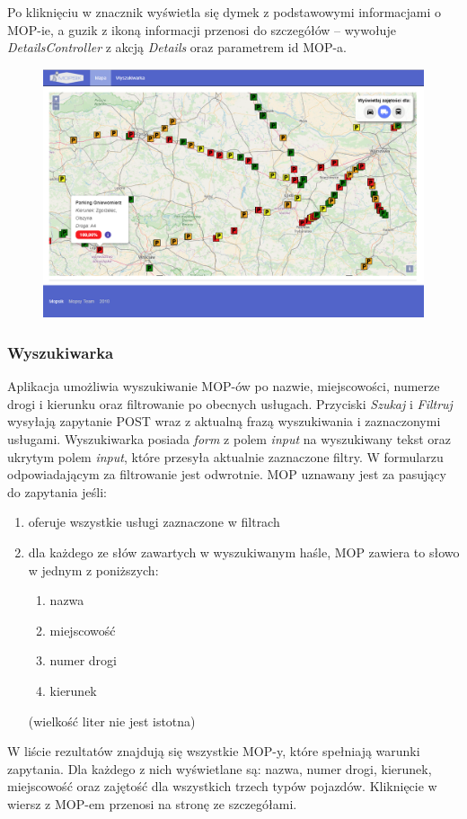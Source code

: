 Po kliknięciu w znacznik wyświetla się dymek z podstawowymi informacjami o MOP-ie, a guzik z ikoną informacji przenosi do szczegółów -- wywołuje \textit{DetailsController} z akcją \textit{Details} oraz parametrem id MOP-a.

\begin{figure}[!htb]
\centering
\includegraphics[width=\textwidth]{images/mopsik_www/map.png}
\label{mopsik_www_map}
\end{figure}

\subsubsection{Wyszukiwarka}
Aplikacja umożliwia wyszukiwanie MOP-ów po nazwie, miejscowości, numerze drogi i kierunku oraz filtrowanie po obecnych usługach. Przyciski \textit{Szukaj} i \textit{Filtruj} wysyłają zapytanie POST wraz z aktualną frazą wyszukiwania i zaznaczonymi usługami.
Wyszukiwarka posiada \textit{form} z polem \textit{input} na wyszukiwany tekst oraz ukrytym polem \textit{input}, które przesyła aktualnie zaznaczone filtry. W formularzu odpowiadającym za filtrowanie jest odwrotnie.  
MOP uznawany jest za pasujący do zapytania jeśli:
\begin{enumerate}
\item oferuje wszystkie usługi zaznaczone w filtrach
\item dla każdego ze słów zawartych w wyszukiwanym haśle, MOP zawiera to słowo w jednym z poniższych:
\begin{enumerate}
\item nazwa
\item miejscowość
\item numer drogi
\item kierunek
\end{enumerate}
(wielkość liter nie jest istotna)
\end{enumerate}
W liście rezultatów znajdują się wszystkie MOP-y, które spełniają warunki zapytania. Dla każdego z nich wyświetlane są: nazwa, numer drogi, kierunek, miejscowość oraz zajętość dla wszystkich trzech typów pojazdów. Kliknięcie w wiersz z MOP-em przenosi na stronę ze szczegółami.


